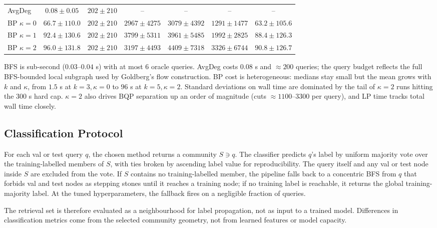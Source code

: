 \documentclass[11pt]{article}
\begin{document}
\begin{table}[t]
\begin{tabular}{lcccccc}
AvgDeg            & $0.08 \pm 0.05$  & $202 \pm 210$ & --                & --                  & --                  & --              \\
BP $\kappa{=}0$   & $66.7 \pm 110.0$ & $202 \pm 210$ & $2967 \pm 4275$   & $3079 \pm 4392$     & $1291 \pm 1477$     & $63.2 \pm 105.6$ \\
BP $\kappa{=}1$   & $92.4 \pm 130.6$ & $202 \pm 210$ & $3799 \pm 5311$   & $3961 \pm 5485$     & $1992 \pm 2825$     & $88.4 \pm 126.3$ \\
BP $\kappa{=}2$   & $96.0 \pm 131.8$ & $202 \pm 210$ & $3197 \pm 4493$   & $4409 \pm 7318$     & $3326 \pm 6744$     & $90.8 \pm 126.7$ \\
\bottomrule
\end{tabular}
\end{table}

BFS is sub-second ($0.03$--$0.04$ s) with at most $6$ oracle queries.
AvgDeg costs $0.08$ s and $\approx 200$ queries; the query budget
reflects the full BFS-bounded local subgraph used by Goldberg's flow
construction. BP cost is heterogeneous: medians stay small but the mean
grows with $k$ and $\kappa$, from $1.5$ s at $k = 3, \kappa = 0$ to
$96$ s at $k = 5, \kappa = 2$. Standard deviations on wall time are
dominated by the tail of $\kappa = 2$ runs hitting the $300$ s hard cap.
$\kappa = 2$ also drives BQP separation up an order of magnitude
(cuts $\approx 1100$--$3300$ per query), and LP time tracks total wall
time closely.

\subsection{Classification Protocol}
\label{sec:classify-protocol}

For each val or test query $q$, the chosen method returns a community
$S \ni q$. The classifier predicts $q$'s label by uniform majority vote
over the training-labelled members of $S$, with ties broken by ascending
label value for reproducibility. The query itself and any val or test
node inside $S$ are excluded from the vote. If $S$ contains no
training-labelled member, the pipeline falls back to a concentric BFS
from $q$ that forbids val and test nodes as stepping stones until it
reaches a training node; if no training label is reachable, it returns
the global training-majority label. At the tuned hyperparameters, the
fallback fires on a negligible fraction of queries.

The retrieval set is therefore evaluated as a neighbourhood for label
propagation, not as input to a trained model. Differences in
classification metrics come from the selected community geometry, not
from learned features or model capacity.
\end{document}
